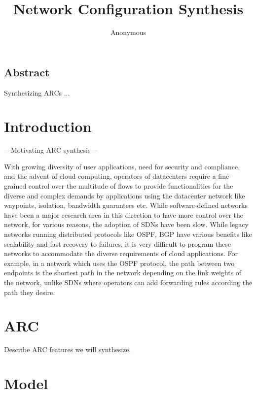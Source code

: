 \documentclass{hotnets16}
\begin{document}
 {}
\date{}


\title{Network Configuration Synthesis}

\author{Anonymous}

\maketitle


\subsection*{Abstract}

Synthesizing ARCs ...

\section{Introduction}
---Motivating ARC synthesis---


With growing diversity of user applications, need for security and compliance, and the advent of cloud computing, operators of datacenters require a fine-grained control over the multitude of flows to provide functionalities for the diverse and complex demands by applications using the datacenter network like waypoints, isolation, bandwidth guarantees etc. While software-defined networks have been a major research area in this direction to have more control over the network, for various reasons, the adoption of SDNs have been slow. While legacy networks running distributed protocols like OSPF, BGP have various benefits like scalability and fast recovery to failures, it is very difficult to program these networks to accommodate the diverse requirements of cloud applications. For example, in a network which uses the OSPF protocol, the path between two endpoints is the shortest path in the network depending on the link weights of the network, unlike SDNs where operators can add forwarding rules according the path they desire.
\section{ARC}

Describe ARC features we will synthesize.

\section{Model}
\end{document}
